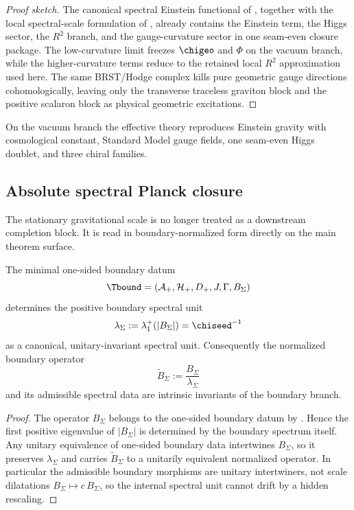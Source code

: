 \begin{proof}[Proof sketch]
The canonical spectral Einstein functional of
, together with the local
spectral-scale formulation of , already contains the Einstein
term, the Higgs sector, the $R^2$ branch, and the gauge-curvature sector in one seam-even closure
package. The low-curvature limit freezes $\chigeo$ and $\Phi$ on the vacuum branch, while the
higher-curvature terms reduce to the retained local $R^2$ approximation used here. The same
BRST/Hodge complex kills pure geometric gauge directions cohomologically, leaving only the
transverse traceless graviton block and the positive scalaron block as physical geometric
excitations.
\end{proof}

\begin{corollary}
On the vacuum branch the effective theory reproduces Einstein gravity with cosmological constant, Standard Model gauge fields, one seam-even Higgs doublet, and three chiral families.
\end{corollary}

\subsection{Absolute spectral Planck closure}

The stationary gravitational scale is no longer treated as a downstream completion block. It is read
in boundary-normalized form directly on the main theorem surface.

\begin{theorem}
\label{thm:boundary-spectral-unit-rigidity}
The minimal one-sided boundary datum
\[
\Tbound=(\mathcal A_+,\mathcal H_+,D_+,J,\Gamma,B_\Sigma)
\]
determines the positive boundary spectral unit
\[
\lambda_\Sigma:=\lambda_1^+(|B_\Sigma|)=\chiseed^{-1}
\]
as a canonical, unitary-invariant spectral unit. Consequently the normalized boundary operator
\[
\widetilde B_\Sigma:=\frac{B_\Sigma}{\lambda_\Sigma}
\]
and its admissible spectral data are intrinsic invariants of the boundary branch.
\end{theorem}

\begin{proof}
The operator $B_\Sigma$ belongs to the one-sided boundary datum by
. Hence the first positive eigenvalue of $|B_\Sigma|$ is determined
by the boundary spectrum itself. Any unitary equivalence of one-sided boundary data intertwines
$B_\Sigma$, so it preserves $\lambda_\Sigma$ and carries $\widetilde B_\Sigma$ to a unitarily
equivalent normalized operator. In particular the admissible boundary morphisms are unitary
intertwiners, not scale dilatations $B_\Sigma\mapsto c\,B_\Sigma$, so the internal spectral unit
cannot drift by a hidden rescaling.
\end{proof}

